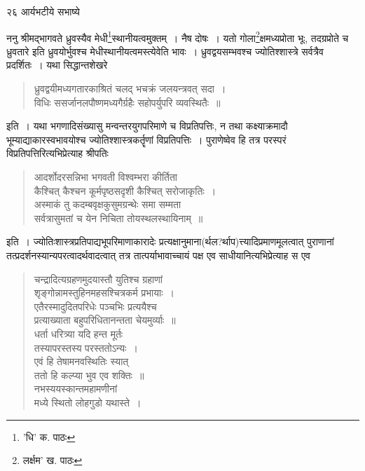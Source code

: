 \documentclass[11pt, openany]{book}
\begin{document}
{\newpage

\vspace{3cm} २६\hspace{4cm} आर्यभटीये सभाष्ये 

\vspace{0.3cm}
\noindent ननु श्रीमद्भागवते ध्रुवस्यैव मेधी\renewcommand{\thefootnote}{१}\footnote{'धि' क. पाठः}स्थानीयत्वमुक्तम्~। नैष दोषः~। यतो गोला\renewcommand{\thefootnote}{२}\footnote{लर्क्षम' ख. पाठः}क्षमध्यप्रोता भूः, तदग्रप्रोते च ध्रुवतारे इति ध्रुवयोर्भुवश्च मेधीस्थानीयत्वमस्त्येवेति भावः~। ध्रुवद्वयसम्भवश्च ज्योतिश्शास्त्रे सर्वत्रैव प्रदर्शितः~। यथा सिद्धान्तशेखरे\textendash

\begin{quote}
{\qt ध्रुवद्वयीमध्यगतारकाश्रितं चलद् भचक्रं जलयन्त्रवत् सदा~।\\
विधिः ससर्जानलपौष्णमध्यगैर्ग्रहैः सहोपर्युपरि व्यवस्थितैः~॥}
\end{quote}

\noindent इति~। यथा भगणादिसंख्यासु मन्वन्तरयुगपरिमाणे च विप्रतिपत्तिः, न तथा कक्ष्याक्रमादौ भूम्याद्याकारस्वभावयोश्च ज्योतिश्शास्त्रकर्तॄणां विप्रतिपत्तिः~। पुराणेष्वेव हि तत्र परस्परं विप्रतिपत्तिरित्यभिप्रेत्याह श्रीपतिः\textendash

\begin{quote}
{\qt आदर्शोदरसन्निभा भगवती विश्वम्भरा कीर्तिता\\
कैश्चित् कैश्चन कूर्मपृष्ठसदृशी कैश्चित् सरोजाकृतिः~।\\
अस्माकं तु कदम्बवृक्षकुसुमग्रन्थेः समा सम्मता\\
सर्वत्रासुमतां च येन निचिता तोयस्थलस्थायिनाम्~॥}
\end{quote}

\begin{sloppypar}
\noindent इति~। ज्योतिःशास्त्रप्रतिपाद्यभूपरिमाणाकारादेः प्रत्यक्षानुमाना(र्थल?र्थाप)त्त्यादिप्रमाणमूलत्वात् पुराणानां तत्प्रदर्शनस्यान्यपरत्वादर्थवादत्वात् तत्र तात्पर्याभावाच्चायं पक्ष एव साधीयानित्यभिप्रेत्याह स एव\textendash
\end{sloppypar}
\begin{quote}
{\qt चन्द्रादित्यग्रहणमुदयास्तौ युतिश्च ग्रहाणां\\
शृङ्गोन्नामस्तुहिनमहसश्चित्रकर्म प्रभायाः~।\\
एतैरस्मादुदितपरिधेः पञ्चभिः प्रत्ययैश्च\\
प्रत्याख्याता बहुपरिधितानन्तता चेयमुर्व्याः~॥\\
धर्ता धरित्र्या यदि हन्त मूर्तः\\
तस्यापरस्तस्य परस्ततोऽन्यः~।\\
एवं हि तेषामनवस्थितिः स्यात्\\
ततो हि कल्प्या भुव एव शक्तिः~॥\\
नभस्ययस्कान्तमहामणीनां\\
मध्ये स्थितो लोहगुडो यथास्ते~।}
\end{quote}


}
\end{document}
